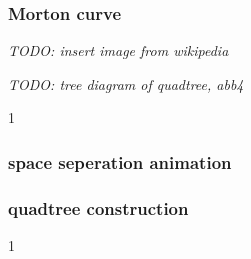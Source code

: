 \documentclass{beamer}
\begin{document}
\begin{frame}
    \frametitle{Morton curve}
    \textit{TODO: insert image from wikipedia}
\end{frame}


\begin{frame}
    \resizebox{\textwidth}{!}{%
        
    }
\end{frame}


\begin{frame}
    \resizebox{\textwidth}{!}{%
        
    }
\end{frame}


\begin{frame}
    \textit{TODO: tree diagram of quadtree, abb4}
    \resizebox{\textwidth}{!}{%
        
    }
\end{frame}


\begin{frame}
\begin{animateinline}[%
    controls={step},
    buttonsize=10pt
]{1}
\end{animateinline}
\end{frame}


\begin{frame}
    \frametitle{space seperation animation}
    \begin{center}
    \end{center}
\end{frame}


\begin{frame}
    \frametitle{quadtree construction}
    \begin{center}
    \end{center}
\end{frame}


\begin{frame}
\begin{animateinline}[%
    controls={step},
    buttonsize=10pt
]{1}
\end{animateinline}
\end{frame}
\end{document}
